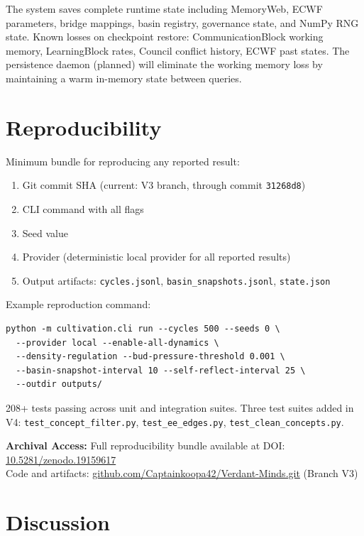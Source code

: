 \documentclass[11pt,a4paper]{article}
\begin{document}
The system saves complete runtime state including MemoryWeb, ECWF parameters, bridge mappings, basin registry, governance state, and NumPy RNG state. Known losses on checkpoint restore: CommunicationBlock working memory, LearningBlock rates, Council conflict history, ECWF past states. The persistence daemon (planned) will eliminate the working memory loss by maintaining a warm in-memory state between queries.

\section{Reproducibility}

Minimum bundle for reproducing any reported result:

\begin{enumerate}[nosep]
    \item Git commit SHA (current: V3 branch, through commit \texttt{31268d8})
    \item CLI command with all flags
    \item Seed value
    \item Provider (deterministic local provider for all reported results)
    \item Output artifacts: \texttt{cycles.jsonl}, \texttt{basin\_snapshots.jsonl}, \texttt{state.json}
\end{enumerate}

Example reproduction command:
\begin{verbatim}
python -m cultivation.cli run --cycles 500 --seeds 0 \
  --provider local --enable-all-dynamics \
  --density-regulation --bud-pressure-threshold 0.001 \
  --basin-snapshot-interval 10 --self-reflect-interval 25 \
  --outdir outputs/
\end{verbatim}

208+ tests passing across unit and integration suites. Three test suites added in V4: \texttt{test\_concept\_filter.py}, \texttt{test\_ee\_edges.py}, \texttt{test\_clean\_concepts.py}.


\noindent \textbf{Archival Access:} Full reproducibility bundle available at DOI: \href{https://doi.org/10.5281/zenodo.19159617}{10.5281/zenodo.19159617} \\
Code and artifacts: \href{https://github.com/Captainkoopa42/Verdant-Minds.git}{github.com/Captainkoopa42/Verdant-Minds.git} (Branch V3)

\section{Discussion}
\end{document}
